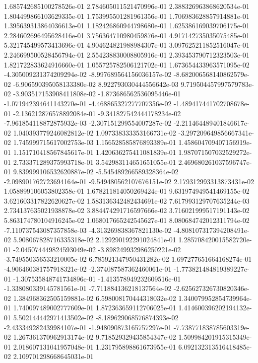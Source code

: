 1.685742685100278526e-01
2.784605011521470996e-01
2.388326963868620534e-01
1.804499866103629335e-01
1.753995501281961356e-01
1.706983628857914881e-01
1.395639313864036613e-01
1.182426860944798680e-01
1.625386169039706175e-01
2.284602696495628416e-01
3.756364710980459876e-01
4.917142735035075485e-01
5.321745499573413696e-01
4.904624821988984307e-01
3.097625211852516047e-01
2.246699500528456794e-01
2.554238830008805916e-01
2.393453790712323503e-01
1.821722833624916660e-01
1.055725782506121702e-01
1.673654433963571095e-02
-4.305009231374209294e-02
-8.997689564156036157e-02
-8.682006568140862579e-02
-6.906590395058133380e-02
8.922793030444556642e-03
9.719504457997579783e-02
-3.903517153908411808e-02
-1.873686562536095446e-01
-1.071942394641143270e-01
-4.468865327277707356e-02
-1.489417441702708678e-01
-2.136212876578892084e-01
-9.341827542444178234e-02
-7.961854118872875932e-03
-2.307151299554007287e-02
-2.211464489401846617e-02
1.040393779246082812e-02
1.097338333353166731e-02
-3.297209649856667341e-02
1.745999715617002753e-03
1.156528585876893389e-01
1.458604709407156919e-01
1.151710418567845617e-01
1.420636275411081839e-01
1.987071507032529272e-01
2.733371289375993718e-01
3.542983114651651055e-01
2.469680261037596747e-01
9.839999106532620887e-02
-5.545489266589328364e-02
-2.098901762723694164e-01
-9.549480562107676151e-02
2.179312993313873431e-02
1.058899106053802358e-01
1.678211814050269424e-01
9.631974949541469155e-02
3.621603317822620627e-02
1.583136342482434691e-02
7.617993129707635244e-03
2.734137635021938878e-02
3.884474291716597666e-02
3.716021999517191143e-02
5.863174780104916245e-02
1.068017665242545627e-01
8.080684742012311794e-02
-7.110737543087357858e-03
-4.313269838367821130e-02
-4.808107317394208491e-02
5.908067828716335318e-02
2.129290192291024841e-01
1.285708420015582720e-01
-2.045074449824593049e-02
-3.898249932986250221e-02
-3.749550356533210005e-02
6.785921347950431282e-02
1.697277651664168274e-01
-4.906460381757918321e-02
-2.374087587362460061e-01
-1.773821484819389227e-01
-1.307535848741734896e-01
-1.413578949232609516e-01
-1.338080339145781561e-01
-7.711884136218137564e-02
-2.625627326730820346e-02
1.384968362505159881e-02
6.598008170444318032e-02
1.340079952854739964e-01
1.740097489002777609e-01
1.872363659112706025e-01
1.414600396202194132e-01
5.502144442971413502e-02
-8.189629068576874393e-02
-2.433349282439984107e-01
-1.948090873165757297e-01
-7.738771838785603319e-02
1.267361370962913174e-02
9.718529329435854347e-02
1.509984201915315349e-01
2.018607131041957048e-01
1.231795898861673955e-01
6.092132313516418485e-02
2.109701298668645031e-01
